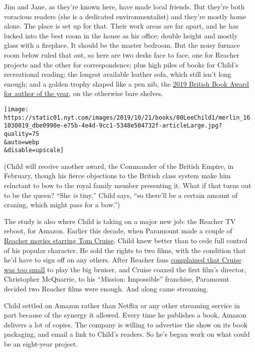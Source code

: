 Jim and Jane, as they're known here, have made local friends. But
they're both voracious readers (she is a dedicated environmentalist) and
they're mostly home alone. The place is set up for that. Their work
areas are far apart, and he has lucked into the best room in the house
as his office: double height and mostly glass with a fireplace. It
should be the master bedroom. But the noisy furnace room below ruled
that out, so here are two desks face to face, one for Reacher projects
and the other for correspondence; plus high piles of books for Child's
recreational reading; the longest available leather sofa, which still
isn't long enough; and a golden trophy shaped like a pen nib, the
\href{https://www.thebookseller.com/british-book-awards/2019-author-year}{2019
British Book Award for author of the year}, on the otherwise bare
shelves.

\texttt{[image: https://static01.nyt.com/images/2019/10/21/books/00LeeChild1/merlin\_161030019\_dbe0990e-e75b-4e4d-9cc1-5348e504732f-articleLarge.jpg?quality=75\\\&auto=webp\\\&disable=upscale]}

(Child will receive another award, the Commander of the British Empire,
in February, though his fierce objections to the British class system
make him reluctant to bow to the royal family member presenting it. What
if that turns out to be the queen? ``She \emph{is} tiny,'' Child says,
``so there'll be a certain amount of craning, which might pass for a
bow.'')

The study is also where Child is taking on a major new job: the Reacher
TV reboot, for Amazon. Earlier this decade, when Paramount made a couple
of
\href{https://www.nytimes.com/2012/12/21/movies/tom-cruise-in-jack-reacher.html}{Reacher
movies starring Tom Cruise}, Child knew better than to cede full control
of his popular character. He sold the rights to two films, with the
condition that he'd have to sign off on any others. After Reacher fans
\href{https://www.nytimes.com/2012/12/09/movies/tom-cruise-as-lee-childs-fictional-hero-in-jack-reacher.html}{complained
that Cruise was too small} to play the big bruiser, and Cruise coaxed
the first film's director, Christopher McQuarrie, to his ``Mission:
Impossible'' franchise, Paramount decided two Reacher films were enough.
And along came streaming.

Child settled on Amazon rather than Netflix or any other streaming
service in part because of the synergy it allowed. Every time he
publishes a book, Amazon delivers a lot of copies. The company is
willing to advertise the show on its book packaging, and email a link to
Child's readers. So he's begun work on what could be an eight-year
project.

